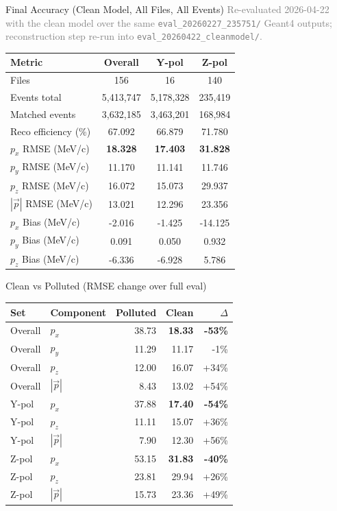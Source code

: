 \documentclass[11pt]{beamer}
\begin{document}
\begin{frame}{Final Accuracy (Clean Model, All Files, All Events)}
\small
\textcolor{gray}{Re-evaluated 2026-04-22 with the clean model over the same
\texttt{eval\_20260227\_235751/} Geant4 outputs; reconstruction step re-run
into \texttt{eval\_20260422\_cleanmodel/}.}
\begin{table}
\centering
\begin{tabular}{lccc}
\toprule
Metric & Overall & Y-pol & Z-pol \\
\midrule
Files & 156 & 16 & 140 \\
Events total & 5,413,747 & 5,178,328 & 235,419 \\
Matched events & 3,632,185 & 3,463,201 & 168,984 \\
Reco efficiency (\%) & 67.092 & 66.879 & 71.780 \\
\(p_x\) RMSE (MeV/c) & \textbf{18.328} & \textbf{17.403} & \textbf{31.828} \\
\(p_y\) RMSE (MeV/c) & 11.170 & 11.141 & 11.746 \\
\(p_z\) RMSE (MeV/c) & 16.072 & 15.073 & 29.937 \\
\(|\vec{p}|\) RMSE (MeV/c) & 13.021 & 12.296 & 23.356 \\
\(p_x\) Bias (MeV/c)  &  -2.016 &  -1.425 & -14.125 \\
\(p_y\) Bias (MeV/c)  &   0.091 &   0.050 &   0.932 \\
\(p_z\) Bias (MeV/c)  &  -6.336 &  -6.928 &   5.786 \\
\bottomrule
\end{tabular}
\end{table}
\end{frame}

\begin{frame}{Clean vs Polluted (RMSE change over full eval)}
\small
\begin{table}
\centering
\begin{tabular}{llrrr}
\toprule
Set & Component & Polluted & Clean & $\Delta$ \\
\midrule
Overall & $p_x$  & 38.73 & \textbf{18.33} & \textbf{-53\%} \\
Overall & $p_y$  & 11.29 & 11.17 & -1\% \\
Overall & $p_z$  & 12.00 & 16.07 & +34\% \\
Overall & $|\vec p|$ &  8.43 & 13.02 & +54\% \\
Y-pol   & $p_x$  & 37.88 & \textbf{17.40} & \textbf{-54\%} \\
Y-pol   & $p_z$  & 11.11 & 15.07 & +36\% \\
Y-pol   & $|\vec p|$ &  7.90 & 12.30 & +56\% \\
Z-pol   & $p_x$  & 53.15 & \textbf{31.83} & \textbf{-40\%} \\
Z-pol   & $p_z$  & 23.81 & 29.94 & +26\% \\
Z-pol   & $|\vec p|$ & 15.73 & 23.36 & +49\% \\
\bottomrule
\end{tabular}
\end{table}
\end{frame}
\end{document}
